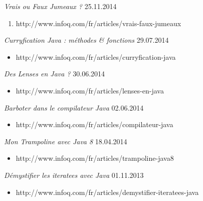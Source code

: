 \documentclass{res}
\begin{document}
\begin{resume}
{\sl Vrais ou Faux Jumeaux ?}  \hfill    25.11.2014 \\
\vspace{-5mm}
\begin{enumerate}[itemsep=1mm]
\item[]  \scriptsize http://www.infoq.com/fr/articles/vrais-faux-jumeaux
\end{enumerate}
\vspace{-2mm}

{\sl Curryfication Java : méthodes \& fonctions}  \hfill    29.07.2014 \\
\vspace{-5mm}
\begin{itemize} %
 \item[] \scriptsize http://www.infoq.com/fr/articles/curryfication-java
\end{itemize}


{\sl Des Lenses en Java ?}  \hfill    30.06.2014	\\
\begin{itemize} %
 \item[] http://www.infoq.com/fr/articles/lenses-en-java
\end{itemize}

{\sl Barboter dans le compilateur Java}  \hfill    02.06.2014	\\
\begin{itemize} %
 \item[] http://www.infoq.com/fr/articles/compilateur-java
\end{itemize}

{\sl Mon Trampoline avec Java 8}  \hfill    18.04.2014	\\
\begin{itemize} %
 \item[] http://www.infoq.com/fr/articles/trampoline-java8
\end{itemize}

{\sl Démystifier les iteratees avec Java}  \hfill    01.11.2013	\\
\begin{itemize} %
 \item[] http://www.infoq.com/fr/articles/demystifier-iteratees-java
\end{itemize}


\end{resume}
\end{document}
